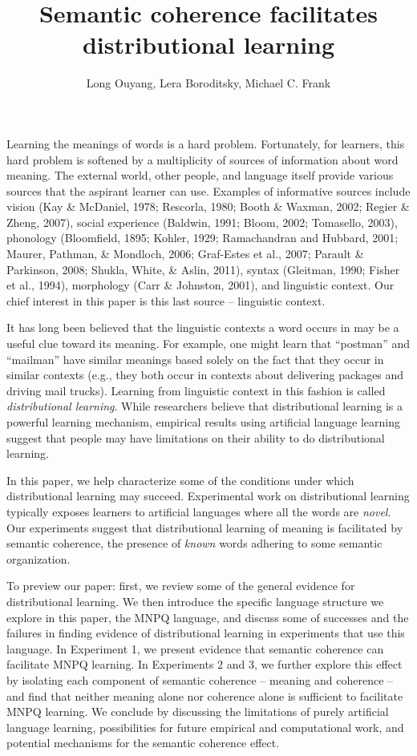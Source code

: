 \documentclass[man,floatsintext]{apa6}
\title{Semantic coherence facilitates distributional learning}
\author{Long Ouyang, Lera Boroditsky, Michael C. Frank}
\affiliation{Stanford University}
\begin{document}
\maketitle

Learning the meanings of words is a hard problem. Fortunately, for learners, this hard problem is softened by a multiplicity of sources of information about word meaning. The external world, other people, and language itself provide various sources that the aspirant learner can use. Examples of informative sources include vision (Kay \& McDaniel, 1978; Rescorla, 1980; Booth \& Waxman, 2002; Regier \& Zheng, 2007), social experience (Baldwin, 1991; Bloom, 2002; Tomasello, 2003), phonology (Bloomfield, 1895; Kohler, 1929; Ramachandran and Hubbard, 2001; Maurer, Pathman, \& Mondloch, 2006; Graf-Estes et al., 2007; Parault \& Parkinson, 2008; Shukla, White, \& Aslin, 2011), syntax (Gleitman, 1990; Fisher et al., 1994), morphology (Carr \& Johnston, 2001), and linguistic context. Our chief interest in this paper is this last source -- linguistic context.

It has long been believed that the linguistic contexts a word occurs in may be a useful clue toward its meaning. For example, one might learn that ``postman'' and ``mailman'' have similar meanings based solely on the fact that they occur in similar contexts (e.g., they both occur in contexts about delivering packages and driving mail trucks). Learning from linguistic context in this fashion is called \emph{distributional learning}. While researchers believe that distributional learning is a powerful learning mechanism, empirical results using artificial language learning suggest that people may have limitations on their ability to do distributional learning.
 
In this paper, we help characterize some of the conditions under which distributional learning may succeed. Experimental work on distributional learning typically exposes learners to artificial languages where all the words are \emph{novel}. Our experiments suggest that distributional learning of meaning is facilitated by semantic coherence, the presence of \emph{known} words adhering to some semantic organization.

To preview our paper: first, we review some of the general evidence for distributional learning. We then introduce the specific language structure we explore in this paper, the MNPQ language, and discuss some of successes and the failures in finding evidence of distributional learning in experiments that use this language. In Experiment 1, we present evidence that semantic coherence can facilitate MNPQ learning. In Experiments 2 and 3, we further explore this effect by isolating each component of semantic coherence -- meaning and coherence -- and find that neither meaning alone nor coherence alone is sufficient to facilitate MNPQ learning. We conclude by discussing the limitations of purely artificial language learning, possibilities for future empirical and computational work, and potential mechanisms for the semantic coherence effect.
\end{document}
